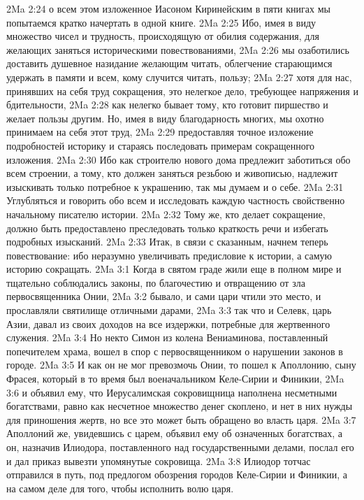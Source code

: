 \vs 2Ma 2:24 о всем этом изложенное Иасоном Киринейским в пяти книгах мы попытаемся кратко начертать в одной книге.
\vs 2Ma 2:25 Ибо, имея в виду множество чисел и трудность, происходящую от обилия содержания, для желающих заняться историческими повествованиями,
\vs 2Ma 2:26 мы озаботились доставить душевное назидание желающим читать, облегчение старающимся удержать в памяти и всем, кому случится читать, пользу;
\vs 2Ma 2:27 хотя для нас, принявших на себя труд сокращения, это нелегкое дело, требующее напряжения и бдительности,
\vs 2Ma 2:28 как нелегко бывает тому, кто готовит пиршество и желает пользы другим. Но, имея в виду благодарность многих, мы охотно принимаем на себя этот труд,
\vs 2Ma 2:29 предоставляя точное изложение подробностей историку и стараясь последовать примерам сокращенного изложения.
\vs 2Ma 2:30 Ибо как строителю нового дома предлежит заботиться обо всем строении, а тому, кто должен заняться резьбою и живописью, надлежит изыскивать только потребное к украшению, так мы думаем и о себе.
\vs 2Ma 2:31 Углубляться и говорить обо всем и исследовать каждую частность свойственно начальному писателю истории.
\vs 2Ma 2:32 Тому же, кто делает сокращение, должно быть предоставлено преследовать только краткость речи и избегать подробных изысканий.
\vs 2Ma 2:33 Итак, в связи с сказанным, начнем теперь повествование: ибо неразумно увеличивать предисловие к истории, а самую историю сокращать.
\vs 2Ma 3:1 Когда в святом граде жили еще в полном мире и тщательно соблюдались законы, по благочестию и отвращению от зла первосвященника Онии,
\vs 2Ma 3:2 бывало, и сами цари чтили это место, и прославляли святилище отличными дарами,
\vs 2Ma 3:3 так что и Селевк, царь Азии, давал из своих доходов на все издержки, потребные для жертвенного служения.
\vs 2Ma 3:4 Но некто Симон из колена Вениаминова, поставленный попечителем храма, вошел в спор с первосвященником о нарушении законов в городе.
\vs 2Ma 3:5 И как он не мог превозмочь Онии, то пошел к Аполлонию, сыну Фрасея, который в то время был военачальником Келе-Сирии и Финикии,
\vs 2Ma 3:6 и объявил ему, что Иерусалимская сокровищница наполнена несметными богатствами, равно как несчетное множество денег скоплено, и нет в них нужды для приношения жертв, но все это может быть обращено во власть царя.
\vs 2Ma 3:7 Аполлоний же, увидевшись с царем, объявил ему об означенных богатствах, а он, назначив Илиодора, поставленного над государственными делами, послал его и дал приказ вывезти упомянутые сокровища.
\vs 2Ma 3:8 Илиодор тотчас отправился в путь, под предлогом обозрения городов Келе-Сирии и Финикии, а на самом деле для того, чтобы исполнить волю царя.
